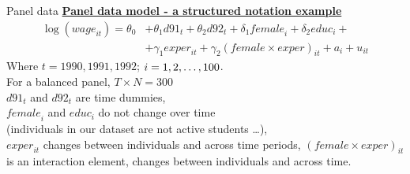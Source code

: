 \documentclass[usenames,dvipsnames]{beamer}
\newcommand{\mytikzmark}[2]{%
  \tikz[remember picture,inner sep=0pt,outer sep=0pt,baseline,anchor=base] 
    \node (#1) {\ensuremath{#2}};}
\begin{document}
\begin{frame}{Panel data}
\textbf{\underline{Panel data model - a structured notation example}} \\
\begin{align*}
\log(\textit{wage}_{it}) = \theta_0 & + \theta_1 d91_t + \theta_2 d92_t + \delta_1 \textit{female}_i + \delta_2 \textit{educ}_i +\\
& + \gamma_1 \textit{exper}_{it} + \gamma_2 (\textit{female} \times \textit{exper})_{it} + a_i + u_{it}
\end{align*}
Where $t = 1990, 1991, 1992$; \quad $i = 1, 2, \dots , \mytikzmark{100}{100}$. \\
For a balanced panel, $T \times N = 300$ \\
\vspace{0.2cm}
$d91_t$ and $d92_t$ are time dummies, \\
$\textit{female}_i$ and $\textit{educ}_i$ do not change over time \\(individuals in our dataset are not active students \dots ), \\
$\textit{exper}_{it}$ changes between individuals and across time periods,
$(\textit{female} \times \textit{exper})_{it}$ is an interaction element, changes between individuals and across time.
\end{frame}
\end{document}
